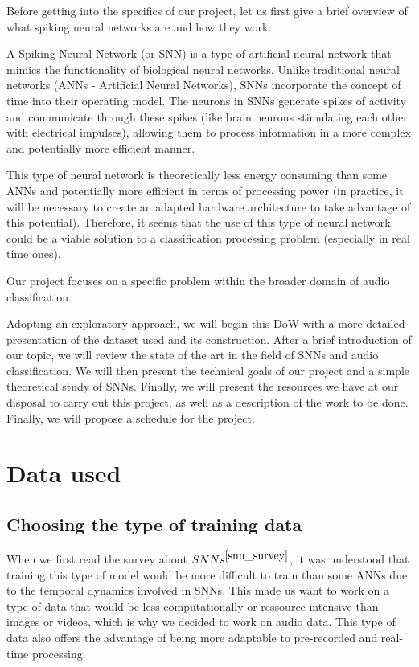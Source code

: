 \documentclass[11pt]{article}
\begin{document}
Before getting into the specifics of our project, let us first give a brief overview of what spiking neural networks are and how they work:

A Spiking Neural Network (or SNN) is a type of artificial neural network that mimics the functionality of biological neural networks. Unlike traditional neural networks (ANNs - Artificial Neural Networks), SNNs incorporate the concept of time into their operating model. The neurons in SNNs generate spikes of activity and communicate through these spikes (like brain neurons stimulating each other with electrical impulses), allowing them to process information in a more complex and potentially more efficient manner.

This type of neural network is theoretically less energy consuming than some ANNs and potentially more efficient in terms of processing power (in practice, it will be necessary to create an adapted hardware architecture to take advantage of this potential). Therefore, it seems that the use of this type of neural network could be a viable solution to a classification processing problem (especially in real time ones).

Our project focuses on a specific problem within the broader domain of audio classification.

Adopting an exploratory approach, we will begin this DoW with a more detailed presentation of the dataset used and its construction. After a brief introduction of our topic, we will review the state of the art in the field of SNNs and audio classification. We will then present the technical goals of our project and a simple theoretical study of SNNs. Finally, we will present the resources we have at our disposal to carry out this project, as well as a description of the work to be done. Finally, we will propose a schedule for the project.


\section{Data used}
\subsection{Choosing the type of training data}

When we first read the survey about $SNNs^{\cite{snn_survey}}$, it was understood that training this type of model would be more difficult to train than some ANNs due to the temporal dynamics involved in SNNs. This made us want to work on a type of data that would be less computationally or ressource intensive than images or videos, which is why we decided to work on audio data. This type of data also offers the advantage of being more adaptable to pre-recorded and real-time processing.
\end{document}
